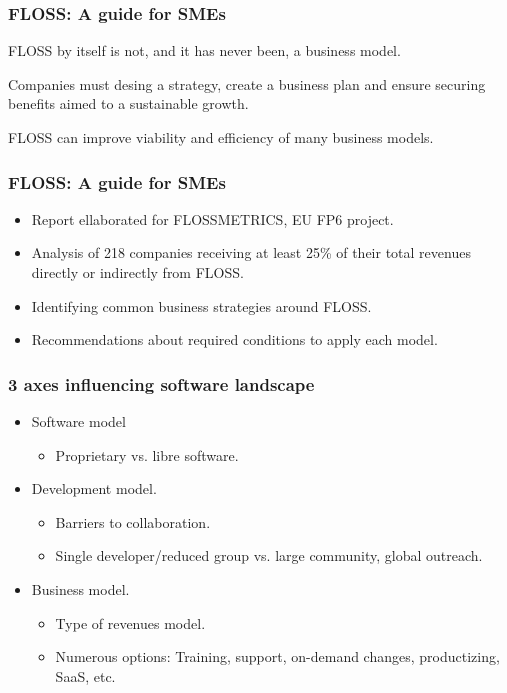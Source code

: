 
\begin{frame}
 \frametitle{FLOSS: A guide for SMEs}
\begin{center}
 \begin{LARGE} FLOSS by itself is not, and it has never been, a business model. \end{LARGE}
\end{center}
\begin{center}
 Companies must desing a \alert{strategy}, create a \alert{business plan} and ensure 
\alert{securing benefits} aimed to a sustainable growth.
\end{center}
\begin{center}
 FLOSS can improve \alert{viability} and \alert{efficiency} of many business models.
\end{center}


\end{frame}

\begin{frame}
 \frametitle{FLOSS: A guide for SMEs}
 \begin{itemize}
  \item Report ellaborated for FLOSSMETRICS, EU FP6 project.
  \item Analysis of 218 companies receiving at least 25\% of their total revenues directly or indirectly from FLOSS.
  \item Identifying common business strategies around FLOSS.
  \item Recommendations about required conditions to apply each model.
 \end{itemize}
\end{frame}

\begin{frame}
 \frametitle{3 axes influencing software landscape}
 \begin{itemize}
  \item \alert{Software model}
  \begin{itemize}
   \item Proprietary vs. libre software.
  \end{itemize}
  \item \alert{Development model}.
  \begin{itemize}
   \item Barriers to collaboration.
   \item Single developer/reduced group vs. large community, global outreach.
  \end{itemize}
  \item \alert{Business model}.
  \begin{itemize}
   \item Type of revenues model.
   \item Numerous options: Training, support, on-demand changes, productizing, SaaS, etc.
  \end{itemize}
 \end{itemize}
\end{frame}

